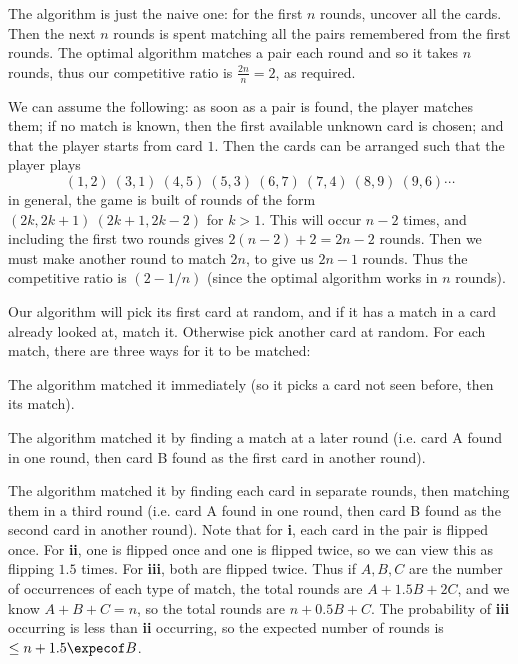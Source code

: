 \benum
    \item The algorithm is just the naive one: for the first $n$ rounds, uncover all the cards.
    Then the next $n$ rounds is spent matching all the pairs remembered from the first rounds.
    The optimal algorithm matches a pair each round and so it takes $n$ rounds, thus our competitive ratio is $\frac{2n}n=2$, as required.
    \item We can assume the following: as soon as a pair is found, the player matches them; if no match is known, then the first available unknown card is chosen; and that the player starts from card $1$.
    Then the cards can be arranged such that the player plays
    $$ (1,2)\ (3,1)\ (4,5)\ (5,3)\ (6,7)\ (7,4)\ (8,9)\ (9,6)\cdots $$
    in general, the game is built of rounds of the form $(2k,2k+1)\ (2k+1,2k-2)$ for $k>1$.
    This will occur $n-2$ times, and including the first two rounds gives $2(n-2)+2=2n-2$ rounds.
    Then we must make another round to match $2n$, to give us $2n-1$ rounds.
    Thus the competitive ratio is $(2-1/n)$ (since the optimal algorithm works in $n$ rounds).
    \item Our algorithm will pick its first card at random, and if it has a match in a card already looked at, match it.
    Otherwise pick another card at random.
    For each match, there are three ways for it to be matched:
    \benum
        \item The algorithm matched it immediately (so it picks a card not seen before, then its match).
        \item The algorithm matched it by finding a match at a later round (i.e. card A found in one round, then card B found as the first card in another round).
        \item The algorithm matched it by finding each card in separate rounds, then matching them in a third round (i.e. card A found in one round, then card B found as the second card in another
        round).
    \eenum
    Note that for {\bf i}, each card in the pair is flipped once.
    For {\bf ii}, one is flipped once and one is flipped twice, so we can view this as flipping $1.5$ times.
    For {\bf iii}, both are flipped twice.
    Thus if $A,B,C$ are the number of occurrences of each type of match, the total rounds are $A+1.5B+2C$, and we know $A+B+C=n$, so the total rounds are $n+0.5B+C$.
    The probability of {\bf iii} occurring is less than {\bf ii} occurring, so the expected number of rounds is $\leq n+1.5\expecof B$.
\eenum

\bexerc

